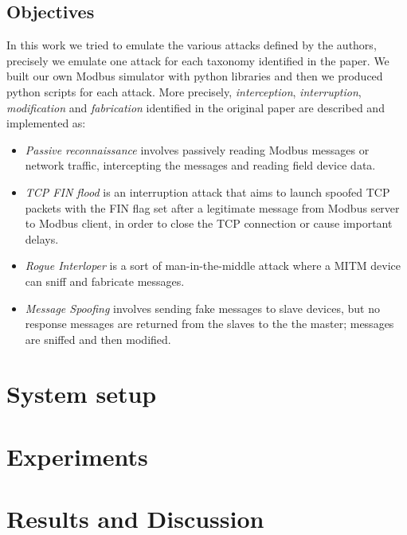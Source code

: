 \documentclass[12pt]{article}
\begin{document}
\subsection{Objectives}
In this work we tried to emulate the various attacks defined by the authors, precisely we emulate one attack for each taxonomy identified in the paper. We built our own Modbus simulator with python libraries and then we produced python scripts for each attack.
More precisely, \textit{interception}, \textit{interruption}, \textit{modification} and \textit{fabrication} identified in the original paper are described and implemented as:
\begin{itemize}
    \item \textit{Passive reconnaissance} involves passively reading Modbus messages or network traffic, intercepting the messages and reading field device data.
    \item \textit{TCP FIN flood} is an interruption attack that aims to launch spoofed TCP packets with the FIN flag set after a legitimate message from Modbus server to Modbus client, in order to close the TCP connection or cause important delays.
    \item \textit{Rogue Interloper} is a sort of man-in-the-middle attack where a MITM device can sniff and fabricate messages.
    \item \textit{Message Spoofing} involves sending fake messages to slave devices, but no response messages are returned from the slaves to the the master; messages are sniffed and then modified.
\end{itemize}

\section{System setup}


\section{Experiments}
\section{Results and Discussion}
\printbibliography 
\end{document}
